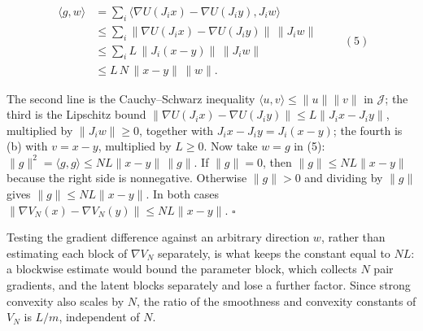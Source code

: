 \documentclass[11pt,a4paper]{report}
\begin{document}
\[\begin{aligned}\langle g,w\rangle&=\sum_i\bigl\langle\nabla U(J_ix)-\nabla U(J_iy),J_iw\bigr\rangle\\&\le\sum_i\bigl\|\nabla U(J_ix)-\nabla U(J_iy)\bigr\|\,\|J_iw\|\\&\le\sum_iL\,\|J_i(x-y)\|\,\|J_iw\|\\&\le L\,N\,\|x-y\|\,\|w\| .\end{aligned}\qquad(5)\]


The second line is the Cauchy–Schwarz inequality \(\langle u,v\rangle\le\|u\|\|v\|\) in \(\mathcal J\); the third is the Lipschitz bound \(\|\nabla U(J_ix)-\nabla U(J_iy)\|\le L\|J_ix-J_iy\|\), multiplied by \(\|J_iw\|\ge0\), together with \(J_ix-J_iy=J_i(x-y)\); the fourth is (b) with \(v=x-y\), multiplied by \(L\ge0\). Now take \(w=g\) in (5): \(\|g\|^2=\langle g,g\rangle\le NL\|x-y\|\,\|g\|\). If \(\|g\|=0\), then \(\|g\|\le NL\|x-y\|\) because the right side is nonnegative. Otherwise \(\|g\|>0\) and dividing by \(\|g\|\) gives \(\|g\|\le NL\|x-y\|\). In both cases \(\|\nabla V_N(x)-\nabla V_N(y)\|\le NL\|x-y\|\). \(\square\)




Testing the gradient difference against an arbitrary direction \(w\), rather than estimating each block of \(\nabla V_N\) separately, is what keeps the constant equal to \(NL\): a blockwise estimate would bound the parameter block, which collects \(N\) pair gradients, and the latent blocks separately and lose a further factor. Since strong convexity also scales by \(N\), the ratio of the smoothness and convexity constants of \(V_N\) is \(L/m\), independent of \(N\).
\end{document}
